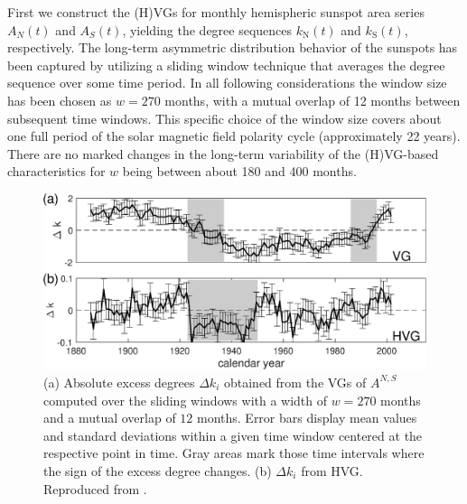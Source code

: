 		First we construct the (H)VGs for monthly hemispheric sunspot area series $A_{N}(t)$ and $A_{S}(t)$, yielding the degree sequences $k_\mathrm{N}(t)$ and $k_\mathrm{S}(t)$, respectively. The long-term asymmetric distribution behavior of the sunspots has been captured by utilizing a sliding window technique that averages the degree sequence over some time period. In all following considerations the window size has been chosen as $w = 270$ months, with a mutual overlap of 12 months between subsequent time windows. This specific choice of the window size covers about one full period of the solar magnetic field polarity cycle (approximately 22 years). There are no marked changes in the long-term variability of the (H)VG-based characteristics for $w$ being between about 180 and 400 months.
\begin{figure}[htbp]
	\centering
	\includegraphics[width=0.8\columnwidth]{Chapter06_Applications/north_southDegreeComXWin130P.eps}
\caption{\small {(a) Absolute excess degrees $\Delta k_i$ obtained from the VGs of $A^{N,S}$ computed over the sliding windows with a width of $w = 270$ months and a mutual overlap of $12$ months. Error bars display mean values and standard deviations within a given time window centered at the respective point in time. Gray areas mark those time intervals where the sign of the excess degree changes. (b) $\Delta k_i$ from HVG. Reproduced from \cite{Zou2014}. }
\label{degreeComX_ns_area270}}
\end{figure}

